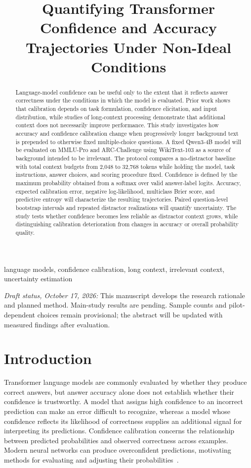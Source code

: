 \documentclass[conference]{IEEEtran}
\title{Quantifying Transformer Confidence and Accuracy Trajectories Under Non-Ideal Conditions}
\author{\IEEEauthorblockN{Matthew M. Montoya}
\IEEEauthorblockA{Johns Hopkins University\\Engineering for Professionals\\
\texttt{mmonto16@jh.edu}}}
\begin{document}
\maketitle
\begin{abstract}
Language-model confidence can be useful only to the extent that it reflects answer correctness under the conditions in which the model is evaluated. Prior work shows that calibration depends on task formulation, confidence elicitation, and input distribution, while studies of long-context processing demonstrate that additional context does not necessarily improve performance. This study investigates how accuracy and confidence calibration change when progressively longer background text is prepended to otherwise fixed multiple-choice questions. A fixed Qwen3-4B model will be evaluated on MMLU-Pro and ARC-Challenge using WikiText-103 as a source of background intended to be irrelevant. The protocol compares a no-distractor baseline with total context budgets from 2,048 to 32,768 tokens while holding the model, task instructions, answer choices, and scoring procedure fixed. Confidence is defined by the maximum probability obtained from a softmax over valid answer-label logits. Accuracy, expected calibration error, negative log-likelihood, multiclass Brier score, and predictive entropy will characterize the resulting trajectories. Paired question-level bootstrap intervals and repeated distractor realizations will quantify uncertainty. The study tests whether confidence becomes less reliable as distractor context grows, while distinguishing calibration deterioration from changes in accuracy or overall probability quality.
\end{abstract}
\begin{IEEEkeywords}
language models, confidence calibration, long context, irrelevant context, uncertainty estimation
\end{IEEEkeywords}

\noindent\textit{Draft status, October 17, 2026:} This manuscript develops the research rationale and planned method. Main-study results are pending. Sample counts and pilot-dependent choices remain provisional; the abstract will be updated with measured findings after evaluation.

\section{Introduction}
Transformer language models are commonly evaluated by whether they produce correct answers, but answer accuracy alone does not establish whether their confidence is trustworthy. A model that assigns high confidence to an incorrect prediction can make an error difficult to recognize, whereas a model whose confidence reflects its likelihood of correctness supplies an additional signal for interpreting its predictions. Confidence calibration concerns the relationship between predicted probabilities and observed correctness across examples. Modern neural networks can produce overconfident predictions, motivating methods for evaluating and adjusting their probabilities~\cite{guo2017}.
\end{document}
